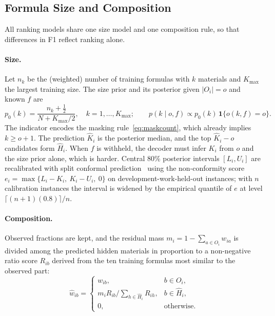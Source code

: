 \documentclass[applsci,article,submit,oneauthor]{Definitions/mdpi}
\begin{document}
\subsection{Formula Size and Composition}
\label{sec:count}

All ranking models share one size model and one composition rule, so that differences in F1 reflect ranking alone.

\paragraph{Size.} Let $n_k$ be the (weighted) number of training formulas with $k$ materials and $K_{\max}$ the largest training size. The size prior and its posterior given $|O_i|=o$ and known $f$ are
\begin{equation}
p_0(k)=\frac{n_k+\frac12}{N+K_{\max}/2},\quad k=1,\dots,K_{\max};\qquad
p(k\mid o,f)\propto p_0(k)\,\mathbf 1\{o(k,f)=o\}.
\label{eq:count}
\end{equation}
The indicator encodes the masking rule~\eqref{eq:maskcount}, which already implies $k\ge o+1$. The prediction $\widehat K_i$ is the posterior median, and the top $\widehat K_i-o$ candidates form $\widehat H_i$. When $f$ is withheld, the decoder must infer $K_i$ from $o$ and the size prior alone, which is harder. Central 80\% posterior intervals $[L_i,U_i]$ are recalibrated with split conformal prediction~\cite{lei2018,angelopoulos2023} using the non-conformity score $e_i=\max\{L_i-K_i,\ K_i-U_i,\ 0\}$ on development-work-held-out instances; with $n$ calibration instances the interval is widened by the empirical quantile of $e$ at level $\lceil(n+1)(0.8)\rceil/n$.

\paragraph{Composition.} Observed fractions are kept, and the residual mass $m_i=1-\sum_{a\in O_i}w_{ia}$ is divided among the predicted hidden materials in proportion to a non-negative ratio score $R_{ib}$ derived from the ten training formulas most similar to the observed part:
\begin{equation}
\widehat w_{ib}=\begin{cases}w_{ib},& b\in O_i,\\ m_iR_{ib}\big/\sum_{h\in\widehat H_i}R_{ih},& b\in\widehat H_i,\\ 0,&\text{otherwise.}\end{cases}
\label{eq:composition}
\end{equation}
\end{document}
